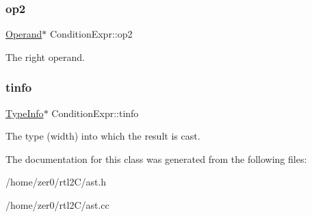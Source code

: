 \subsubsection{\texorpdfstring{op2}{op2}}
{\footnotesize\ttfamily \hyperlink{class_operand}{Operand}$\ast$ Condition\+Expr\+::op2\hspace{0.3cm}{\ttfamily [protected]}}

The right operand. \mbox{\label{class_condition_expr_a17d3426b183c1493c9301152f94d28ba}} 
\subsubsection{\texorpdfstring{tinfo}{tinfo}}
{\footnotesize\ttfamily \hyperlink{class_type_info}{Type\+Info}$\ast$ Condition\+Expr\+::tinfo\hspace{0.3cm}{\ttfamily [protected]}}

The type (width) into which the result is cast. 

The documentation for this class was generated from the following files\+:\begin{DoxyCompactItemize}
\item 
/home/zer0/rtl2\+C/ast.\+h\item 
/home/zer0/rtl2\+C/ast.\+cc\end{DoxyCompactItemize}
